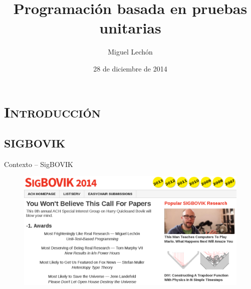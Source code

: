 \documentclass[xcolor=x11names,compress]{beamer}
\renewcommand{\(}{\begin{columns}}
\renewcommand{\)}{\end{columns}}
\newcommand{\<}[1]{\begin{column}{#1}}
\renewcommand{\>}{\end{column}}
\begin{document}
\begin{frame}
    \title{Programación basada en pruebas unitarias}
\author{Miguel Lechón} 
\date{28 de diciembre de 2014}
\titlepage
\end{frame}


\section{\scshape Introducción}
\subsection{SIGBOVIK}
\begin{frame}{Contexto -- SigBOVIK}
    \begin{figure}[t]
        \centering
        \includegraphics[width=1.0\textwidth]{images/sigbovik.png}
    \end{figure}
\end{frame}

\end{document}
